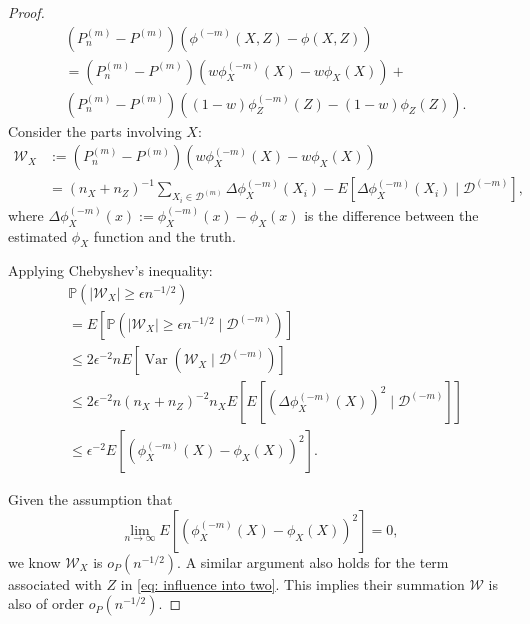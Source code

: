 \documentclass[11pt]{article}
\begin{document}
\begin{proof}
\begin{equation}
\label{eq: influence into two}
    \begin{aligned}
      & \left(P_n^{(m)}-P^{(m)}\right)\left(\phi^{(-m)}(X, Z)-\phi(X, Z)\right)\\
       & = \left(P_n^{(m)}-P^{(m)}\right)\left(w \phi_X^{(-m)}(X)-w \phi_X(X)\right)+\\
       &\left(P_n^{(m)}-P^{(m)}\right)\left((1-w) \phi_Z^{(-m)}(Z)-(1-w) \phi_Z(Z)\right).
    \end{aligned}
\end{equation}
Consider the parts involving $X$:
\begin{align*}
     \mathcal{W}_X& := \left(P_n^{(m)}-P^{(m)}\right)\left(w \phi_X^{(-m)}(X)-w \phi_X(X)\right)\\
& = (n_X+n_Z)^{-1}\sum_{X_i\in\mathcal{D}^{(m)}} \Delta \phi_X^{(-m)}(X_i) - E[\Delta \phi_X^{(-m)}(X_i) \mid \mathcal{D}^{(-m)}],
\end{align*}
where $\Delta \phi_X^{(-m)}(x) := \phi_X^{(-m)}(x) - \phi_X(x)$ is the difference between the estimated $\phi_X$ function and the truth.

Applying Chebyshev's inequality:
\begin{equation*}
    \begin{aligned}
        & \mathbb{P}\left(\left|\mathcal{W}_X\right| \geq \epsilon n^{-1 / 2}\right)\\
        & =E\left[\mathbb{P}\left(\left|\mathcal{W}_X\right| \geq \epsilon n^{-1 / 2} \mid \mathcal{D}^{(-m)}\right)\right]\\
        & \leq 2 \epsilon^{-2} n E\left[\operatorname{Var}\left(\mathcal{W}_X \mid \mathcal{D}^{(-m)}\right)\right]\\
        & \leq 2 \epsilon^{-2} n\left(n_X+n_Z\right)^{-2} n_X E\left[E\left[\left(\Delta \phi_X^{(-m)}\left(X\right)\right)^2 \mid \mathcal{D}^{(-m)}\right]\right]\\
        & \leq \epsilon^{-2} E\left[\left(\phi_X^{(-m)}(X)-\phi_X(X)\right)^2\right].
    \end{aligned}
\end{equation*}

Given the assumption that 
\begin{equation*}
\lim _{n \rightarrow \infty}
E\left[\left(\phi_X^{(-m)}(X)-\phi_X(X)\right)^2\right] = 0,
\end{equation*}
we know $\mathcal{W}_X$ is $o_P(n^{-1 / 2})$. A similar argument also holds for the term associated with $Z$ in \eqref{eq: influence into two}. This implies their summation $\mathcal{W}$ is also of order $o_P(n^{-1 / 2})$.
\end{proof}
\end{document}
